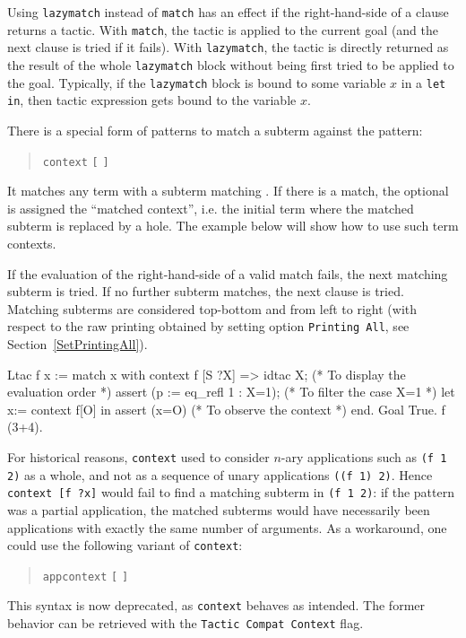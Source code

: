 \begin{Variants}

\item {}
Using {\tt lazymatch} instead of {\tt match} has an effect if the
right-hand-side of a clause returns a tactic. With {\tt match}, the
tactic is applied to the current goal (and the next clause is tried if
it fails). With {\tt lazymatch}, the tactic is directly returned as
the result of the whole {\tt lazymatch} block without being first
tried to be applied to the goal. Typically, if the {\tt lazymatch}
block is bound to some variable $x$ in a {\tt let in}, then tactic
expression gets bound to the variable $x$.

\item {}
There is a special form of patterns to match a subterm against the
pattern:
\begin{quote}
{\tt context} {\ident} {\tt [} {\cpattern} {\tt ]}
\end{quote}
It matches any term with a subterm matching {\cpattern}. If there is
a match, the optional {\ident} is assigned the ``matched context'', i.e.
the initial term where the matched subterm is replaced by a
hole. The example below will show how to use such term contexts.

If the evaluation of the right-hand-side of a valid match fails, the
next matching subterm is tried. If no further subterm matches, the
next clause is tried. Matching subterms are considered top-bottom and
from left to right (with respect to the raw printing obtained by
setting option {\tt Printing All}, see Section~\ref{SetPrintingAll}).

\begin{coq_example}
Ltac f x :=
  match x with
    context f [S ?X] => 
    idtac X;                    (* To display the evaluation order *)
    assert (p := eq_refl 1 : X=1);    (* To filter the case X=1 *)
    let x:= context f[O] in assert (x=O) (* To observe the context *)
  end.
Goal True.
f (3+4).
\end{coq_example}

\item {}
For historical reasons, {\tt context} used to consider $n$-ary applications
such as {\tt (f 1 2)} as a whole, and not as a sequence of unary
applications {\tt ((f 1) 2)}. Hence {\tt context [f ?x]} would fail
to find a matching subterm in {\tt (f 1 2)}: if the pattern was a partial
application, the matched subterms would have necessarily been
applications with exactly the same number of arguments.
As a workaround, one could use the following variant of {\tt context}:
\begin{quote}
{\tt appcontext} {\ident} {\tt [} {\cpattern} {\tt ]}
\end{quote}
This syntax is now deprecated, as {\tt context} behaves as intended. The former
behavior can be retrieved with the {\tt Tactic Compat Context} flag.

\end{Variants}

